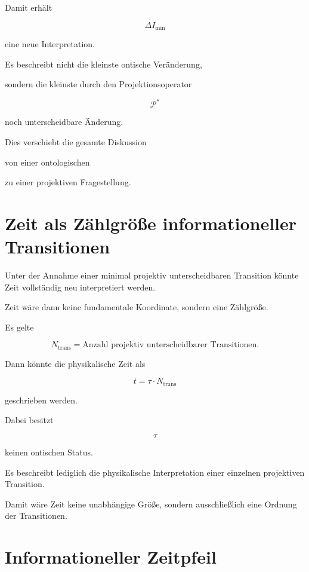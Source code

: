 \documentclass[11pt,a4paper]{article}
\begin{document}
Damit erhält

\[
\Delta I_{\min}
\]

eine neue Interpretation.

Es beschreibt nicht die kleinste ontische Veränderung,

sondern die kleinste durch den Projektionsoperator

\[
\mathcal P^\ast
\]

noch unterscheidbare Änderung.

Dies verschiebt die gesamte Diskussion

von einer ontologischen

zu einer projektiven Fragestellung.


\section{Zeit als Zählgröße informationeller Transitionen}

Unter der Annahme einer minimal projektiv unterscheidbaren
Transition könnte Zeit vollständig neu interpretiert werden.

Zeit wäre dann keine fundamentale Koordinate,
sondern eine Zählgröße.

Es gelte

\[
N_{\mathrm{trans}}
=
\text{Anzahl projektiv unterscheidbarer Transitionen}.
\]

Dann könnte die physikalische Zeit als

\[
t
=
\tau \cdot N_{\mathrm{trans}}
\]

geschrieben werden.

Dabei besitzt

\[
\tau
\]

keinen ontischen Status.

Es beschreibt lediglich die physikalische Interpretation
einer einzelnen projektiven Transition.

Damit wäre Zeit keine unabhängige Größe,
sondern ausschließlich eine Ordnung der Transitionen.

\section{Informationeller Zeitpfeil}
\end{document}
